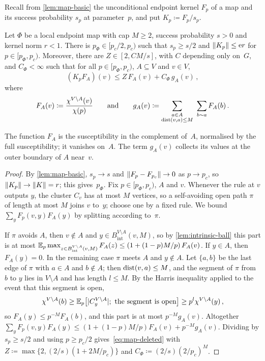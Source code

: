Recall from \cref{lem:map-basic} the unconditional endpoint kernel $F_p$ of a map and its success
probability $s_p$ at parameter~$p$, and put $K_p\coloneqq F_p/s_p$.

\begin{lemma}\label{lem:map-deleted}
Let $\Phi$ be a local endpoint map with cap $M\ge2$, success probability $s>0$ and kernel norm $r<1$.
There is $p_\Phi\in[p_c/2,p_c)$ such that $s_p\ge s/2$ and $\lVert K_p\rVert\le\mathrm{e} r$ for $p\in[p_\Phi,p_c)$.
Moreover, there are $Z\in[2,CM/s]$, with $C$ depending only on~$G$, and $C_\Phi<\infty$ such that for
all $p\in[p_\Phi,p_c)$, $A\subseteq V$ and $v\in V$,
\begin{equation}\label{eq:map-deleted}
  (K_pF_A)(v)\le Z\,F_A(v)+C_\Phi\,g_A(v)\,,
\end{equation}
where
\begin{equation*}
  F_A(v)\coloneqq\frac{\chi^{V\setminus A}(v)}{\chi(p)}\qquad\text{and}\qquad
  g_A(v)\coloneqq\sum_{\substack{a\in A\\\operatorname{dist}(v,a)\le M}}\ \sum_{b\sim a}F_A(b)\,.
\end{equation*}
\end{lemma}

The function $F_A$ is the susceptibility in the complement of~$A$, normalised by the full
susceptibility; it vanishes on~$A$. The term $g_A(v)$ collects its values at the outer boundary of $A$
near~$v$.

\begin{proof}
By \cref{lem:map-basic}, $s_p\to s$ and $\lVert F_p-F_{p_c}\rVert\to0$ as $p\to p_c$, so
$\lVert K_p\rVert\to\lVert K\rVert=r$; this gives~$p_\Phi$. Fix $p\in[p_\Phi,p_c)$, $A$ and $v$. Whenever the rule at
$v$ outputs $y$, the cluster $C_v$ has at most $M$ vertices, so a self-avoiding open path $\pi$ of length
at most $M$ joins $v$ to~$y$; choose one by a fixed rule. We bound $\sum_yF_p(v,y)F_A(y)$ by splitting
according to~$\pi$.

If $\pi$ avoids $A$, then $v\notin A$ and $y\in B^{V\setminus A}_{\mathrm{int}}(v,M)$, so by
\cref{lem:intrinsic-ball} this part is at most
$\mathbb E_p\max_{z\in B^{V\setminus A}_{\mathrm{int}}(v,M)}F_A(z)\le(1+(1-p)M/p)\,F_A(v)$. If $y\in A$, then
$F_A(y)=0$. In the remaining case $\pi$ meets $A$ and $y\notin A$. Let $\{a,b\}$ be the last edge of
$\pi$ with $a\in A$ and $b\notin A$; then $\operatorname{dist}(v,a)\le M$, and the segment of $\pi$ from $b$ to $y$
lies in $V\setminus A$ and has length $l\le M$. By the Harris inequality applied to the event that this
segment is open,
\begin{equation*}
  \chi^{V\setminus A}(b)\ge\mathbb E_p\bigl[\lvert C^{V\setminus A}_y\rvert;\text{ the segment is open}\bigr]
  \ge p^l\chi^{V\setminus A}(y)\,,
\end{equation*}
so $F_A(y)\le p^{-M}F_A(b)$, and this part is at most $p^{-M}g_A(v)$. Altogether
$\sum_yF_p(v,y)F_A(y)\le(1+(1-p)M/p)F_A(v)+p^{-M}g_A(v)$. Dividing by $s_p\ge s/2$ and using
$p\ge p_c/2$ gives~\eqref{eq:map-deleted} with $Z\coloneqq\max\{2,(2/s)(1+2M/p_c)\}$ and
$C_\Phi\coloneqq(2/s)(2/p_c)^M$.
\end{proof}

